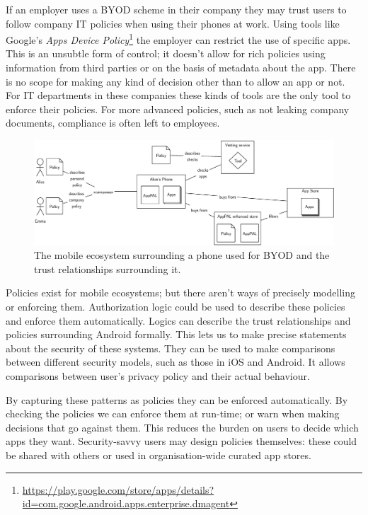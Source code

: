 \documentclass[a4paper]{scrartcl}
\begin{document}
If an employer uses a \ac{BYOD} scheme in their company they may trust users to follow company IT policies when using their phones at work.
Using tools like Google's \emph{Apps Device Policy}\footnote{\url{https://play.google.com/store/apps/details?id=com.google.android.apps.enterprise.dmagent}} the employer can restrict the use of specific apps.
This is an unsubtle form of control; it doesn't allow for rich policies using information from third parties or on the basis of metadata about the app.
There is no scope for making any kind of decision other than to allow an app or not.
For IT departments in these companies these kinds of tools are the only tool to enforce their policies.
For more advanced policies, such as not leaking company documents, compliance is often left to employees.

\begin{figure}[]
  \centering
  \includegraphics[width=1.0\linewidth]{images/ecosystem.eps}
  \caption{The mobile ecosystem surrounding a phone used for \ac{BYOD} and the trust relationships surrounding it.}
  \label{fig:ecosystem}
\end{figure}

Policies exist for mobile ecosystems; but there aren't ways of precisely modelling or enforcing them.
Authorization logic could be used to describe these policies and enforce them automatically.
Logics can describe the trust relationships and policies surrounding Android formally.
This lets us to make precise statements about the security of these systems.
They can be used to make comparisons between different security models, such as those in iOS and Android.
It allows comparisons between user's privacy policy and their actual behaviour.

By capturing these patterns as policies they can be enforced automatically.
By checking the policies we can enforce them at run-time; or warn when making decisions that go against them.
This reduces the burden on users to decide which apps they want.
Security-savvy users may design policies themselves: these could be shared with others or used in organisation-wide curated app stores.
\end{document}
